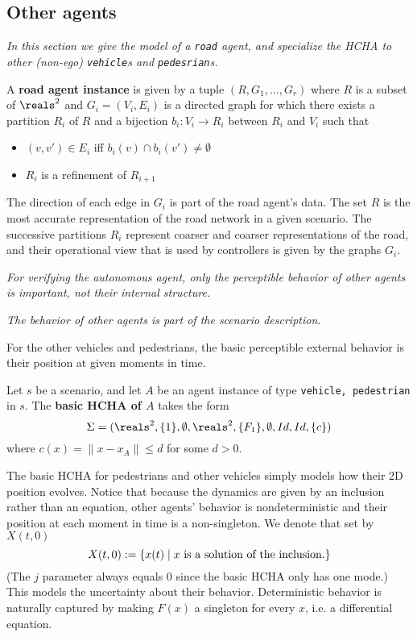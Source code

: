 \subsection{Other agents}
\label{otherAgents}

{\it In this section we give the model of a \texttt{road} agent, and specialize the HCHA to other (non-ego)  \texttt{vehicle}s and \texttt{pedesrian}s.}

\begin{defn}
	\label{def:road}
	A \textbf{road agent instance} is given by a tuple $(R, G_1,\ldots, G_r)$ where 
	$R$ is a subset of $\reals^2$
	and $G_i = (V_i,E_i)$ is a directed graph for which there exists a partition $R_i$ of $R$ and a bijection $b_i: V_i \rightarrow R_i$ between $R_i$ and $V_i$ such that
	\begin{itemize}
		\item  $(v,v') \in E_i$ iff $b_i(v)\cap b_i(v') \neq \emptyset$
		\item $R_i$ is a refinement of $R_{i+1}$
	\end{itemize}
	\end{defn}

The direction of each edge in $G_i$ is part of the road agent's data.
The set $R$ is the most accurate representation of the road network in a given scenario.
The successive partitions $R_i$ represent coarser and coarser representations of the road, and their operational view that is used by controllers is given by the graphs $G_i$.

{\it For verifying the autonomous agent, only the perceptible behavior of other agents is important, not their internal structure.}

{\it The behavior of other agents is part of the scenario description.}

For the other vehicles and pedestrians, the basic perceptible external behavior is their position at given moments in time. 
\begin{defn}
	\label{def:otherAgentsBehavior}
	Let $s$ be a scenario, and let $A$ be an agent instance of type \texttt{vehicle, pedestrian} in $s$.
	The \textbf{basic HCHA of $A$} takes the form 
	\[\Sys = (\reals^2, \{1\}, \emptyset, \reals^2, \{F_1\}, \emptyset, Id, Id, \{c\})\]
	where $c(x) = \|x-x_A\| \leq d$ for some $d > 0$.
	\end{defn}

The basic HCHA for pedestrians and other vehicles simply models how their 2D position evolves. 
Notice that because the dynamics are given by an inclusion rather than an equation, other agents' behavior is nondeterministic and their position at each moment in time is a non-singleton.
We denote that set by $X(t,0)$
\[X(t,0) := \{x(t) \;|\; x \text{ is a solution of the inclusion}.\}\]
(The $j$ parameter always equals 0 since the basic HCHA only has one mode.)
This models the uncertainty about their behavior.
Deterministic behavior is naturally captured by making $F(x)$ a singleton for every $x$, i.e. a differential equation.

